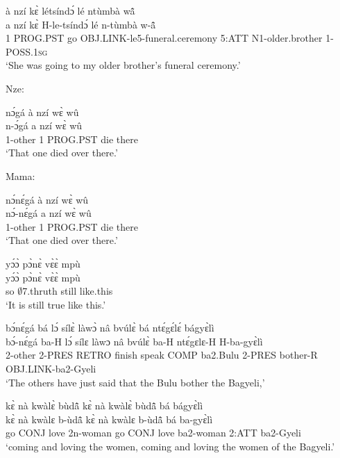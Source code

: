 \begin{exe} 
\exC\label{173} 
  \glll à nzí kɛ̀ létsíndɔ́ lé ntùmbà wã̂ \\
        a nzí kɛ̀ H-le-tsíndɔ́ lé n-tùmbà w-ã̂ \\
         1 PROG.PST go OBJ.LINK-le5-funeral.ceremony 5:ATT N1-older.brother 1-POSS.1\textsc{sg}   \\
    \trans `She was going to my older brother's funeral ceremony.'
\end{exe}

\noindent Nze: 

\begin{exe} 
\exC\label{174} 
  \glll nɔ́gá à nzí wɛ̀ wû \\
        n-ɔ́gá a nzí wɛ̀ wû \\
         1-other 1 PROG.PST die there   \\
    \trans `That one died over there.'
\end{exe}

\noindent Mama:

\begin{exe} 
\exC\label{175} 
  \glll nɔ́nɛ́gá à nzí wɛ̀ wû \\
         nɔ́-nɛ́gá a nzí wɛ̀ wû \\
         1-other 1 PROG.PST die there \\
    \trans `That one died over there.'
\end{exe}

\begin{exe} 
\exC\label{176}
  \glll yɔ́ɔ̀ pɔ̀nɛ̀ vɛ̀ɛ̀ mpù \\
        yɔ́ɔ̀ pɔ̀nɛ̀ vɛ̀ɛ̀ mpù \\
         so $\emptyset$7.thruth still like.this \\
    \trans `It is still true like this.'
\end{exe}

\begin{exe} 
\exC\label{177}
  \glll bɔ́nɛ́gá bá lɔ́ sílɛ̀ làwɔ̀ nâ bvúlɛ̀ bá ntɛ́gɛ́lɛ́ bágyɛ̀lì \\
      bɔ́-nɛ́gá ba-H lɔ́ sílɛ làwɔ nâ bvúlɛ̀ ba-H ntɛ́gɛlɛ-H H-ba-gyɛ̀lì \\
        2-other 2-PRES RETRO  finish speak COMP ba2.Bulu 2-PRES bother-R OBJ.LINK-ba2-Gyeli\\
    \trans `The others have just said that the Bulu bother the Bagyeli,'
\end{exe}

\begin{exe} 
\exC\label{178}
  \glll kɛ̀ nà kwàlɛ̀ bùdã̂ kɛ̀ nà kwàlɛ̀ bùdã̂ bá bágyɛ̀lì\\
        kɛ̀ nà kwàlɛ b-ùdã̂ kɛ̀ nà kwàlɛ b-ùdã̂ bá ba-gyɛ̀lì\\
         go CONJ love 2n-woman go CONJ love ba2-woman  2:ATT ba2-Gyeli\\
    \trans `coming and loving the women, coming and loving the women of the Bagyeli.'
\end{exe}

